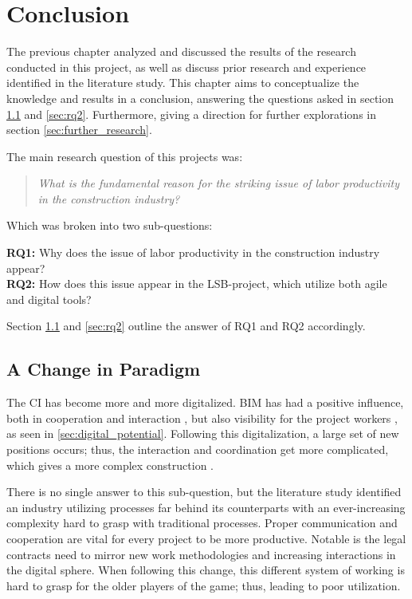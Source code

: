 
\chapter{Conclusion} \label{cha:conclusion}
The previous chapter analyzed and discussed the results of the research conducted in this project, as well as discuss prior research and experience identified in the literature study. This chapter aims to conceptualize the knowledge and results in a conclusion, answering the questions asked in section \ref{sec:rq1} and \ref{sec:rq2}. Furthermore, giving a direction for further explorations in section \ref{sec:further_research}.

\noindent The main research question of this projects was: 
\begin{quote}
    \textit{What is the fundamental reason for the striking issue of labor productivity in the construction industry?} 
\end{quote}

\noindent Which was broken into two sub-questions:

{\noindent \bf RQ1:} Why does the issue of labor productivity in the construction industry appear? \\
{\bf RQ2:} How does this issue appear in the LSB-project, which utilize both agile and digital tools?

Section \ref{sec:rq1} and \ref{sec:rq2} outline the answer of RQ1 and RQ2 accordingly.

\section{A Change in Paradigm} \label{sec:rq1}
The CI has become more and more digitalized. BIM has had a positive influence, both in cooperation and interaction \cite{frank_gehry, gu2010understanding}, but also visibility for the project workers \cite{arayici2010building}, as seen in \ref{sec:digital_potential}. Following this digitalization, a large set of new positions occurs; thus, the interaction and coordination get more complicated, which gives a more complex construction \cite{arayici2010building, eadie2013bim, arayici2011technology}.

There is no single answer to this sub-question, but the literature study identified an industry utilizing processes far behind its counterparts with an ever-increasing complexity hard to grasp with traditional processes. Proper communication and cooperation are vital for every project to be more productive. Notable is the legal contracts need to mirror new work methodologies and increasing interactions in the digital sphere. When following this change, this different system of working is hard to grasp for the older players of the game; thus, leading to poor utilization. 

